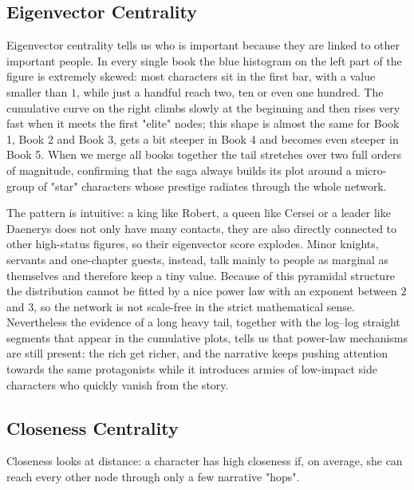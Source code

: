 \documentclass[12pt, a4paper]{article}
\begin{document}
\subsection*{Eigenvector Centrality}
Eigenvector centrality tells us who is important because they are linked to other important people.
In every single book the blue histogram on the left part of the figure is extremely skewed: most characters sit in the first bar, with a value smaller than $1$, while just a handful reach two, ten or even one hundred.  The cumulative curve on the right climbs slowly at the beginning and then rises very fast when it meets the first "elite" nodes; this shape is almost the same for Book 1, Book 2 and Book 3, gets a bit steeper in Book 4 and becomes even steeper in Book 5.  When we merge all books together the tail stretches over two full orders of magnitude, confirming that the saga always builds its plot around a micro-group of "star" characters whose prestige radiates through the whole network.

The pattern is intuitive: a king like Robert, a queen like Cersei or a leader like Daenerys does not only have many contacts, they are also directly connected to other high-status figures, so their eigenvector score explodes.  Minor knights, servants and one-chapter guests, instead, talk mainly to people as marginal as themselves and therefore keep a tiny value.  Because of this pyramidal structure the distribution cannot be fitted by a nice power law with an exponent between $2$ and $3$, so the network is not scale-free in the strict mathematical sense.  Nevertheless the evidence of a long heavy tail, together with the log–log straight segments that appear in the cumulative plots, tells us that power-law mechanisms are still present: the rich get richer, and the narrative keeps pushing attention towards the same protagonists while it introduces armies of low-impact side characters who quickly vanish from the story.

\subsection*{Closeness Centrality}
Closeness looks at distance: a character has high closeness if,
on average, she can reach every other node through only a few narrative "hops".
\end{document}
